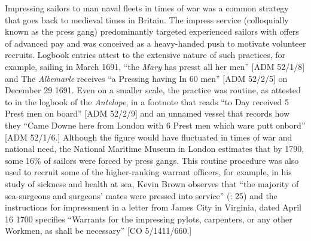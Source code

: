 Impressing sailors to man naval fleets in times of war was a common strategy that goes back to medieval times in Britain. The impress service (colloquially known as the press gang) predominantly targeted experienced sailors with offers of advanced pay and was conceived as a heavy-handed push to motivate volunteer recruits. Logbook entries attest to the extensive nature of such practices, for example, sailing in March 1691, “the \textit{Mary} has presst all her men” [ADM 52/1/8] and The \textit{Albemarle} receives “a Pressing having In 60 men” [ADM 52/2/5] on December 29 1691. Even on a smaller scale, the practice was routine, as attested to in the logbook of the \textit{Antelope}, in a footnote that reads “to Day received 5 Prest men on board” [ADM 52/2/9] and an unnamed vessel that records how they “Came Downe here from London with 6 Prest men which ware putt onbord” [ADM 52/1/6.] Although the figure would have fluctuated in times of war and national need, the National Maritime Museum in London estimates that by 1790, some 16\% of sailors were forced by press gangs. This routine procedure was also used to recruit some of the higher-ranking warrant officers, for example, in his study of sickness and health at sea, Kevin Brown observes that “the majority of sea-surgeons and surgeons’ mates were pressed into service” (\citeyear{Brown2011}: 25) and the instructions for impressment in a letter from James City in Virginia, dated April 16 1700 specifies “Warrants for the impressing pylots, carpenters, or any other Workmen, as shall be necessary” [CO 5/1411/660.]

